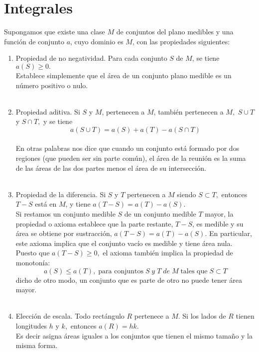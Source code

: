 \chapter{Integrales}
\begin{tcolorbox}
\begin{def.}
Supongamos que existe una clase $M$ de conjuntos del plano medibles y una función de conjunto $a$, cuyo dominio es $M$, con las propiedades siguientes:
\begin{enumerate}[\bfseries 1.]
\item Propiedad de no negatividad. Para cada conjunto $S$ de $M$, se tiene $a(S) \geq 0.$\\
Establece simplemente que el área de un conjunto plano medible es un número positivo o nulo.\\\\

\item Propiedad aditiva. Si $S$ \; y \; $M$, pertenecen a $M$, también pertenecen a $M,$ $S \cup T$ y $S \cap T,$ y se tiene $$a(S \cup T) = a(S) + a(T) - a(S \cap T)$$\\
En otras palabras nos dice que cuando un conjunto está formado por dos regiones (que pueden ser sin parte común), el área de la reunión es la suma de las áreas de las dos partes menos el área de su intersección.\\\\

\item Propiedad de la diferencia. Si $S$ y $T$ pertenecen a $M$ siendo $S \subset T,$ entonces $T - S$ está en $M$, y tiene $a(T-S) = a(T) - a(S)$.\\
Si restamos un conjunto medible $S$ de un conjunto medible $T$ mayor, la propiedad o axioma establece que la parte restante, $T-S$, es medible y su área se obtiene por sustracción, $a(T-S) = a(T) - a(S).$ En particular, este axioma implica que el conjunto vacío es medible y tiene área nula. Puesto que $a(T-S) \geq 0,$ el axioma también implica la propiedad de monotonía:
$$a(S) \leq a(T), \; \mbox{para conjuntos} \; S \; y \; T \; de \; M \; \mbox{tales que} \; S \subset T$$ dicho de otro modo, un conjunto que es parte de otro no puede tener área mayor.\\\\
\item Elección de escala. Todo rectángulo $R$ pertenece a $M$. Si los lados de $R$ tienen longitudes $h$ \; y \; $k,$ entonces $a(R)=hk.$\\
Es decir asigna áreas iguales a los conjuntos que tienen el mismo tamaño y la misma forma. \\\\
\end{enumerate}
\end{def.}
\end{tcolorbox}

